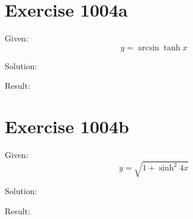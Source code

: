 \documentclass[a4paper, 10pt]{scrartcl}
\begin{document}
\section{Exercise 1004a}

Given:
\[
y = \arcsin{\tanh{x}}
\]

Solution:

Result:

\section{Exercise 1004b}

Given:
\[
y = \sqrt{1 + \sinh^{2}{4x}}
\]

Solution:

Result:
\end{document}
